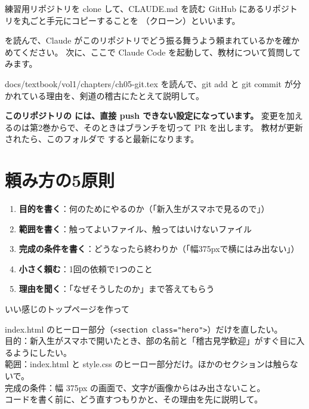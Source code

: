 \begin{step}{練習用リポジトリを clone して、CLAUDE.md を読む}
GitHub にあるリポジトリを丸ごと手元にコピーすることを （クローン）といいます。
 を読んで、Claude がこのリポジトリでどう振る舞うよう頼まれているかを確かめてください。
次に、ここで Claude Code を起動して、教材について質問してみます。
\begin{prompt}
docs/textbook/vol1/chapters/ch05-git.tex を読んで、git add と git commit が分かれている理由を、剣道の稽古にたとえて説明して。
\end{prompt}
\textbf{このリポジトリの  には、直接 push できない設定になっています。}
変更を加えるのは第2巻からで、そのときはブランチを切って PR を出します。
教材が更新されたら、このフォルダで  すると最新になります。
\end{step}

\section{頼み方の5原則}

\begin{enumerate}
  \item \textbf{目的を書く}：何のためにやるのか（「新入生がスマホで見るので」）
  \item \textbf{範囲を書く}：触ってよいファイル、触ってはいけないファイル
  \item \textbf{完成の条件を書く}：どうなったら終わりか（「幅375pxで横にはみ出ない」）
  \item \textbf{小さく頼む}：1回の依頼で1つのこと
  \item \textbf{理由を聞く}：「なぜそうしたのか」まで答えてもらう
\end{enumerate}

\begin{badprompt}
いい感じのトップページを作って
\end{badprompt}

\begin{prompt}
index.html のヒーロー部分（\verb|<section class="hero">|）だけを直したい。\\
目的：新入生がスマホで開いたとき、部の名前と「稽古見学歓迎」がすぐ目に入るようにしたい。\\
範囲：index.html と style.css のヒーロー部分だけ。ほかのセクションは触らないで。\\
完成の条件：幅 375px の画面で、文字が画像からはみ出さないこと。\\
コードを書く前に、どう直すつもりかと、その理由を先に説明して。
\end{prompt}

